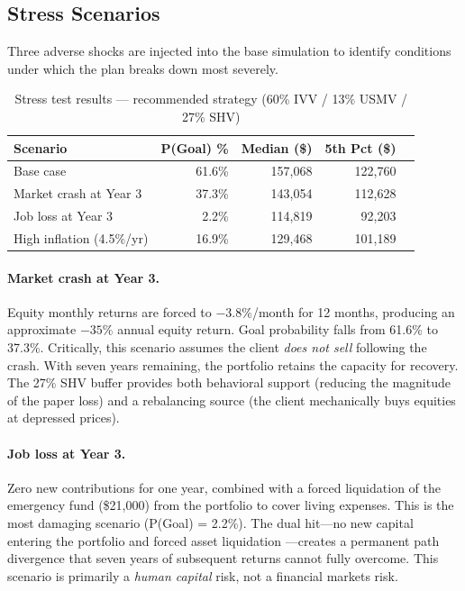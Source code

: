 \documentclass[12pt, letterpaper]{article}
\begin{document}
\subsection{Stress Scenarios}

Three adverse shocks are injected into the base simulation to identify conditions
under which the plan breaks down most severely.

\begin{table}[H]
  \centering
  \caption{Stress test results --- recommended strategy (60\% IVV / 13\% USMV / 27\% SHV)}
  \label{tab:stress}
  \begin{tabular}{lrrrr}
    \toprule
    \textbf{Scenario} & \textbf{P(Goal) \%} & \textbf{Median (\$)} & \textbf{5th Pct (\$)} \\
    \midrule
    Base case                  & 61.6\% & 157{,}068 & 122{,}760 \\
    Market crash at Year 3     & 37.3\% & 143{,}054 & 112{,}628 \\
    Job loss at Year 3         &  2.2\% & 114{,}819 &  92{,}203 \\
    High inflation (4.5\%/yr)  & 16.9\% & 129{,}468 & 101{,}189 \\
    \bottomrule
  \end{tabular}
\end{table}

\paragraph{Market crash at Year 3.}
Equity monthly returns are forced to $-3.8\%$/month for 12 months,
producing an approximate $-35\%$ annual equity return.  Goal probability falls
from 61.6\% to 37.3\%.  Critically, this scenario assumes the client
\textit{does not sell} following the crash.  With seven years remaining, the
portfolio retains the capacity for recovery.  The 27\% SHV buffer provides
both behavioral support (reducing the magnitude of the paper loss) and a
rebalancing source (the client mechanically buys equities at depressed prices).

\paragraph{Job loss at Year 3.}
Zero new contributions for one year, combined with a forced liquidation of the
emergency fund (\$21{,}000) from the portfolio to cover living expenses.
This is the most damaging scenario (P(Goal) = 2.2\%).
The dual hit---no new capital entering the portfolio and forced asset liquidation
---creates a permanent path divergence that seven years of subsequent returns
cannot fully overcome.  This scenario is primarily a \textit{human capital} risk,
not a financial markets risk.
\end{document}
